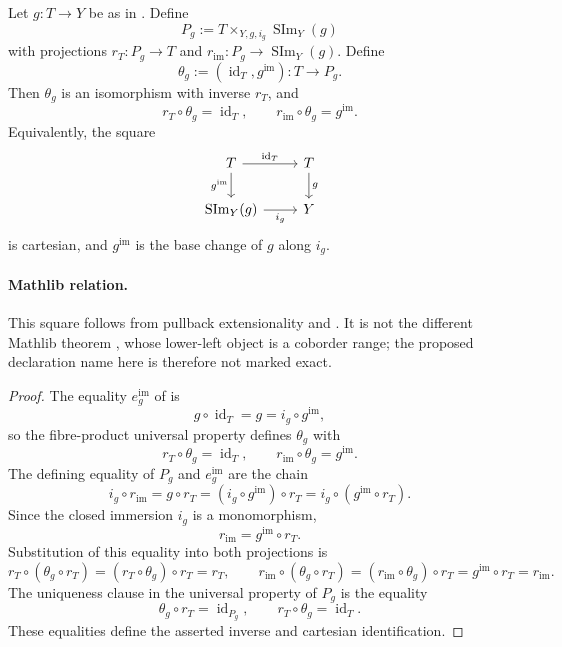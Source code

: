 \begin{lemma}
  \label{lemma:nagata-scheme-image-factor-cartesian}

  Let $g\colon T\to Y$ be as in
  .  Define
  \[
    P_g:=T\times_{Y,g,i_g}\operatorname{SIm}_Y(g)
  \]
  with projections
  $r_T\colon P_g\to T$ and
  $r_{\mathrm{im}}\colon P_g\to\operatorname{SIm}_Y(g)$.  Define
  \[
    \theta_g:=(\operatorname{id}_T,g^{\mathrm{im}})
      \colon T\longrightarrow P_g.
  \]
  Then $\theta_g$ is an isomorphism with inverse $r_T$, and
  \[
    r_T\circ\theta_g=\operatorname{id}_T,
    \qquad
    r_{\mathrm{im}}\circ\theta_g=g^{\mathrm{im}}.
  \]
  Equivalently, the square
  \[
  \begin{tikzcd}
    T \arrow[r,"\operatorname{id}_T"] \arrow[d,"g^{\mathrm{im}}"'] &
    T \arrow[d,"g"]\\
    \operatorname{SIm}_Y(g) \arrow[r,"i_g"'] & Y
  \end{tikzcd}
  \]
  is cartesian, and $g^{\mathrm{im}}$ is the base change of $g$ along
  $i_g$.

  \paragraph{Mathlib relation.}
  This square follows from pullback extensionality and
  \texttt{}.  It is not the different
  Mathlib theorem
  \texttt{}, whose
  lower-left object is a coborder range; the proposed declaration name here
  is therefore not marked exact.
\end{lemma}

\begin{proof}
  The equality $e_g^{\mathrm{im}}$ of
   is
  \[
    g\circ\operatorname{id}_T
      =g
      =i_g\circ g^{\mathrm{im}},
  \]
  so the fibre-product universal property defines $\theta_g$ with
  \[
    r_T\circ\theta_g=\operatorname{id}_T,
    \qquad
    r_{\mathrm{im}}\circ\theta_g=g^{\mathrm{im}}.
  \]
  The defining equality of $P_g$ and $e_g^{\mathrm{im}}$ are the chain
  \[
    i_g\circ r_{\mathrm{im}}
      =g\circ r_T
      =(i_g\circ g^{\mathrm{im}})\circ r_T
      =i_g\circ(g^{\mathrm{im}}\circ r_T).
  \]
  Since the closed immersion $i_g$ is a monomorphism,
  \[
    r_{\mathrm{im}}=g^{\mathrm{im}}\circ r_T.
  \]
  Substitution of this equality into both projections is
  \[
    r_T\circ(\theta_g\circ r_T)
      =(r_T\circ\theta_g)\circ r_T=r_T,
    \qquad
    r_{\mathrm{im}}\circ(\theta_g\circ r_T)
      =(r_{\mathrm{im}}\circ\theta_g)\circ r_T
      =g^{\mathrm{im}}\circ r_T=r_{\mathrm{im}}.
  \]
  The uniqueness clause in the universal property of $P_g$ is the equality
  \[
    \theta_g\circ r_T=\operatorname{id}_{P_g},
    \qquad
    r_T\circ\theta_g=\operatorname{id}_T.
  \]
  These equalities define the asserted inverse and cartesian identification.
\end{proof}

